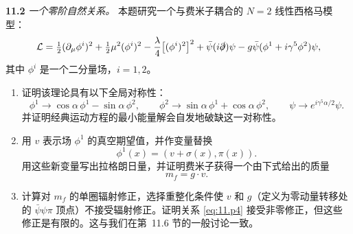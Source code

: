 \textbf{11.2} \emph{一个零阶自然关系。} 本题研究一个与费米子耦合的 $N = 2$ 线性西格马模型：
\begin{equation}
  \mathcal{L} = \tfrac{1}{2}(\partial_\mu\phi^i)^2 + \tfrac{1}{2}\mu^2(\phi^i)^2
    - \frac{\lambda}{4}\bigl[ (\phi^i)^2 \bigr]^2
    + \bar{\psi}(i\slashed{\partial})\psi
    - g\bar{\psi}(\phi^1 + i\gamma^5\phi^2)\psi ,
  \label{eq:11.p1}
\end{equation}
其中 $\phi^i$ 是一个二分量场，$i = 1, 2$。
\begin{enumerate}[label=(\alph*)]
  \item 证明该理论具有以下全局对称性：
    \begin{equation}
      \phi^1 \to \cos\alpha\,\phi^1 - \sin\alpha\,\phi^2,\qquad
      \phi^2 \to \sin\alpha\,\phi^1 + \cos\alpha\,\phi^2,\qquad
      \psi \to e^{i\gamma^5\alpha/2}\psi .
      \label{eq:11.p2}
    \end{equation}
    并证明经典运动方程的最小能量解会自发地破缺这一对称性。
  \item 用 $v$ 表示场 $\phi^1$ 的真空期望值，并作变量替换
    \begin{equation}
      \phi^1(x) = (v + \sigma(x), \pi(x)) .
      \label{eq:11.p3}
    \end{equation}
    用这些新变量写出拉格朗日量，并证明费米子获得一个由下式给出的质量
    \begin{equation}
      m_f = g\cdot v .
      \label{eq:11.p4}
    \end{equation}
  \item 计算对 $m_f$ 的单圈辐射修正，选择重整化条件使 $v$ 和 $g$（定义为零动量转移处的 $\bar{\psi}\psi\pi$ 顶点）不接受辐射修正。证明关系 \eqref{eq:11.p4} 接受非零修正，但这些修正是有限的。这与我们在第~11.6 节的一般讨论一致。
\end{enumerate}

